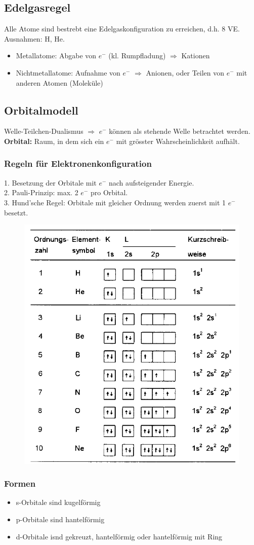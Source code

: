 \subsection{Edelgasregel}
Alle Atome sind bestrebt eine Edelgaskonfiguration zu erreichen, d.h. 8 VE. Ausnahmen: H, He.

\begin{itemize}
	\item Metallatome: Abgabe von $e^-$ (kl. Rumpfladung) $\Rightarrow$ Kationen
	\item Nichtmetallatome: Aufnahme von $e^-$ $\Rightarrow$ Anionen, oder Teilen von $e^-$ mit anderen Atomen (Moleküle)
\end{itemize}

\subsection{Orbitalmodell}
Welle-Teilchen-Dualismus $\Rightarrow$ $e^-$ können als stehende Welle betrachtet werden. \\
\textbf{Orbital:} Raum, in dem sich ein $e^-$ mit grösster Wahrscheinlichkeit aufhält. 

\subsubsection{Regeln für Elektronenkonfiguration}
1. Besetzung der Orbitale mit $e^-$ nach aufsteigender Energie. \\
2. Pauli-Prinzip: max. 2 $e^-$ pro Orbital. \\
3. Hund'sche Regel: Orbitale mit gleicher Ordnung werden zuerst mit 1 $e^-$ besetzt.

\begin{figure}[htbp]
	\centering
	\includegraphics[width=0.75\linewidth]{images/2_Konfiguration_Orbitale.png}
\end{figure}

\subsubsection{Formen}
\begin{itemize}
    \item s-Orbitale sind kugelförmig
    \item p-Orbitale sind hantelförmig
    \item d-Orbitale isnd gekreuzt, hantelförmig oder hantelförmig mit Ring
\end{itemize}